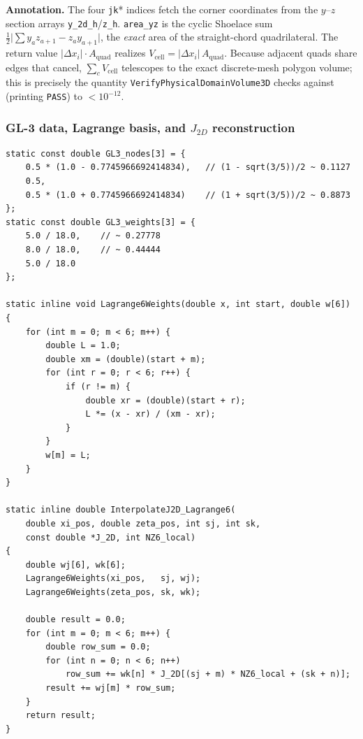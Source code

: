 \documentclass[11pt]{article}
\theoremstyle{definition}
\theoremstyle{remark}
\begin{document}
\noindent\textbf{Annotation.} The four \texttt{jk}* indices fetch the corner
coordinates from the $y$--$z$ section arrays \texttt{y\_2d\_h}/\texttt{z\_h}.
\texttt{area\_yz} is the cyclic Shoelace sum
$\tfrac12\big|\sum y_a z_{a{+}1}-z_a y_{a{+}1}\big|$, the \emph{exact} area of the
straight-chord quadrilateral. The return value $|\Delta x_i|\cdot A_{\text{quad}}$
realizes $V_{\text{cell}}=|\Delta x_i|\,A_{\text{quad}}$. Because adjacent quads
share edges that cancel, $\sum_c V_{\text{cell}}$ telescopes to the exact
discrete-mesh polygon volume; this is precisely the quantity
\texttt{VerifyPhysicalDomainVolume3D} checks against (printing \texttt{PASS}) to $<10^{-12}$.

\subsubsection{GL-3 data, Lagrange basis, and \texorpdfstring{$J_{2D}$}{J2D} reconstruction}

\begin{lstlisting}[caption={GL-3 nodes/weights, degree-5 Lagrange basis, and tensor reconstruction (\texttt{evolution.h}:180--231).}]
static const double GL3_nodes[3] = {
    0.5 * (1.0 - 0.7745966692414834),   // (1 - sqrt(3/5))/2 ~ 0.1127
    0.5,
    0.5 * (1.0 + 0.7745966692414834)    // (1 + sqrt(3/5))/2 ~ 0.8873
};
static const double GL3_weights[3] = {
    5.0 / 18.0,    // ~ 0.27778
    8.0 / 18.0,    // ~ 0.44444
    5.0 / 18.0
};

static inline void Lagrange6Weights(double x, int start, double w[6])
{
    for (int m = 0; m < 6; m++) {
        double L = 1.0;
        double xm = (double)(start + m);
        for (int r = 0; r < 6; r++) {
            if (r != m) {
                double xr = (double)(start + r);
                L *= (x - xr) / (xm - xr);
            }
        }
        w[m] = L;
    }
}

static inline double InterpolateJ2D_Lagrange6(
    double xi_pos, double zeta_pos, int sj, int sk,
    const double *J_2D, int NZ6_local)
{
    double wj[6], wk[6];
    Lagrange6Weights(xi_pos,   sj, wj);
    Lagrange6Weights(zeta_pos, sk, wk);

    double result = 0.0;
    for (int m = 0; m < 6; m++) {
        double row_sum = 0.0;
        for (int n = 0; n < 6; n++)
            row_sum += wk[n] * J_2D[(sj + m) * NZ6_local + (sk + n)];
        result += wj[m] * row_sum;
    }
    return result;
}
\end{lstlisting}
\end{document}
